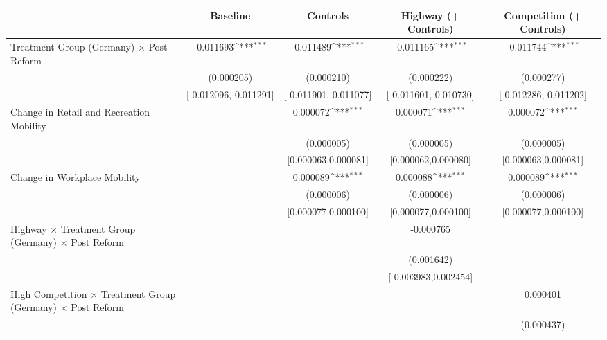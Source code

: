 {
\def\sym#1{\ifmmode^{#1}\else\(^{#1}\)\fi}
\begin{tabular}{l*{4}{c}}
\toprule
                    &\multicolumn{1}{c}{Baseline}&\multicolumn{1}{c}{Controls}&\multicolumn{1}{c}{Highway (+ Controls)}&\multicolumn{1}{c}{Competition (+ Controls)}\\
\midrule
Treatment Group (Germany) $\times$ Post Reform&   -0.011693\sym{***}&   -0.011489\sym{***}&   -0.011165\sym{***}&   -0.011744\sym{***}\\
                    &  (0.000205)         &  (0.000210)         &  (0.000222)         &  (0.000277)         \\
                    &[-0.012096,-0.011291]         &[-0.011901,-0.011077]         &[-0.011601,-0.010730]         &[-0.012286,-0.011202]         \\
Change in Retail and Recreation Mobility&                     &    0.000072\sym{***}&    0.000071\sym{***}&    0.000072\sym{***}\\
                    &                     &  (0.000005)         &  (0.000005)         &  (0.000005)         \\
                    &                     &[0.000063,0.000081]         &[0.000062,0.000080]         &[0.000063,0.000081]         \\
Change in Workplace Mobility&                     &    0.000089\sym{***}&    0.000088\sym{***}&    0.000089\sym{***}\\
                    &                     &  (0.000006)         &  (0.000006)         &  (0.000006)         \\
                    &                     &[0.000077,0.000100]         &[0.000077,0.000100]         &[0.000077,0.000100]         \\
Highway $\times$ Treatment Group (Germany) $\times$ Post Reform&                     &                     &   -0.000765         &                     \\
                    &                     &                     &  (0.001642)         &                     \\
                    &                     &                     &[-0.003983,0.002454]         &                     \\
High Competition $\times$ Treatment Group (Germany) $\times$ Post Reform&                     &                     &                     &    0.000401         \\
                    &                     &                     &                     &  (0.000437)         \\

\end{tabular}}

